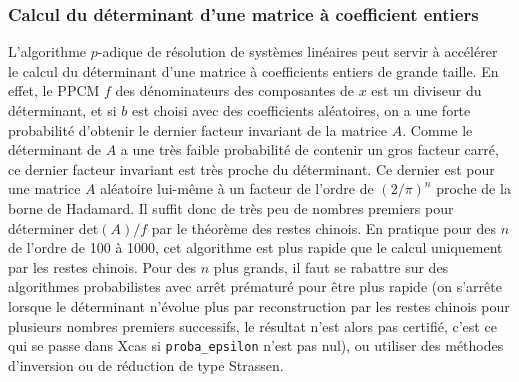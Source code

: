 \documentclass[a4paper,11pt]{article}
\begin{document}
\subsubsection{Calcul du d\'eterminant d'une matrice \`a coefficient entiers}
L'algorithme $p$-adique de r\'esolution de syst\`emes
lin\'eaires peut servir \`a acc\'el\'erer le calcul du
d\'eterminant d'une matrice \`a coefficients entiers de grande taille.
En effet, le PPCM $f$ des d\'enominateurs des composantes de $x$ est
un diviseur du d\'eterminant, et si $b$ est choisi avec des
coefficients al\'eatoires, on a une forte probabilit\'e d'obtenir
le dernier facteur invariant de la matrice $A$. Comme le d\'eterminant
de $A$ a une tr\`es faible probabilit\'e de contenir un gros facteur
carr\'e, ce dernier facteur invariant est tr\`es proche du
d\'eterminant. Ce dernier est pour une matrice $A$ al\'eatoire
lui-m\^eme \`a un facteur de l'ordre de $(2/\pi)^n$ proche
de la borne de Hadamard. Il suffit donc de tr\`es peu de nombres
premiers pour d\'eterminer det$(A)/f$ par le th\'eor\`eme
des restes chinois. En pratique pour des $n$ de l'ordre de 100
\`a 1000, cet algorithme est plus rapide que le calcul uniquement
par les restes chinois. Pour des $n$ plus grands, il faut se
rabattre sur des algorithmes probabilistes avec arr\^et pr\'ematur\'e
pour \^etre plus rapide (on s'arr\^ete lorsque le d\'eterminant
n'\'evolue plus par reconstruction par les restes chinois 
pour plusieurs nombres premiers successifs, le r\'esultat n'est
alors pas certifi\'e, c'est ce qui se passe dans Xcas si
\verb|proba_epsilon| n'est pas nul), 
ou utiliser des m\'ethodes
d'inversion ou de r\'eduction de type Strassen.
\end{document}
